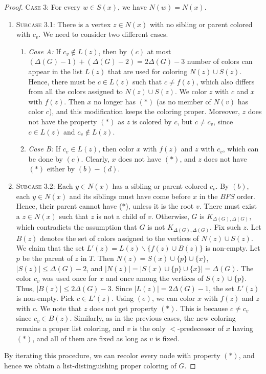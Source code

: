 \documentclass[12pt,reqno,a4paper]{amsart}
\theoremstyle{definition}
\begin{document}
\begin{proof}
\noindent  \textsc{Case 3: } For every $w\in S(x)$, we have $N(w) = N(x)$.
\begin{enumerate}
    \item[]\textsc{Subcase 3.1:} There is a vertex $z\in N(x)$ with no sibling or parent colored with $c_v$. We need to consider two different cases.
    \begin{enumerate}
    \item[]\textit{Case A:}
    If $c_v\not\in L(z)$, then by $(c)$ at most $(\Delta(G)-1) + (\Delta(G)-2) = 2\Delta(G)-3$ number of colors can appear in the list $L(z)$ that are used for coloring $N(z)\cup S(z)$. Hence, there must be $c\in L(z)$ such that $c\neq f(z)$, which also differs from all the colors assigned to $N(z)\cup S(z)$. 
    We color $z$ with $c$ and $x$ with $f(z)$.
    Then $x$ no longer has $(\ast)$ (as no member of $N(v)$ has color $c$), and this modification keeps the coloring proper.
    Moreover, $z$ does not have the property 
    $(\ast)$ as $z$ is colored by $c$, but $c\neq c_{v}$, since $c\in L(z)$ and $c_{v}\not\in L(z)$.
   \item[]  \textit{Case B:} If $c_v\in L(z)$, then color $x$ with $f(z)$ and $z$ with $c_{v}$, which can be done by $(e)$. Clearly, $x$ does not have $(\ast)$, and $z$ does not have $(\ast)$ either by $(b)-(d)$. 
    \end{enumerate}
   
    \item[] \textsc{Subcase 3.2:} Each $y \in N(x)$ has a sibling or parent colored $c_v$. By $(b)$, each $y\in N(x)$ and its siblings must have come before $x$ in the $BFS$ order. Hence, their parent cannot have ($\ast$), unless it is the root $v$. There must exist a $z\in N(x)$ such that $z$ is not a child of $v$. Otherwise, $G$ is $K_{\Delta(G),\Delta(G)}$, which contradicts the assumption that $G$ is not $K_{\Delta(G),\Delta(G)}$. 
    Fix such $z$.
    Let $B(z)$ denotes the set of colors assigned to the vertices of $N(z)\cup S(z)$. We claim that the set $L'(z)=L(z)\backslash \{f(z)\cup B(z)\}$ is non-empty. Let $p$ be the parent of $z$ in $T$. Then $N(z) = S(x) \cup \{p\}\cup \{x\}$, $\vert S(z)\vert \leq \Delta(G)-2$, and $\vert N(z)\vert = \vert S(x)\cup \{p\}\cup \{x\}\vert=\Delta(G)$. The color $c_v$ was used once for $x$ and once among the vertices of $S(z) \cup \{p\}$. Thus, $\vert B(z)\vert\leq 2\Delta(G)-3$. Since $\vert L(z)\vert= 2\Delta(G)-1$, the set $L'(z)$ is non-empty.
    Pick $c\in L'(z)$.
    Using $(e)$, we can color $x$ with $f(z)$ and $z$ with $c$.  We note that $z$ does not get property $(\ast)$. This is because $c\neq c_{v}$ since $c_{v} \in B(z)$.
    Similarly, as in the previous cases, the new coloring remains a proper list coloring, and $v$ is the only $<$-predecessor of $x$ having $(\ast)$, and all of them are fixed as long as $v$ is fixed.
\end{enumerate}
By iterating this procedure, we can recolor every node with property $(\ast)$, and hence we obtain a list-distinguishing proper coloring of $G$.
\end{proof}
\end{document}
